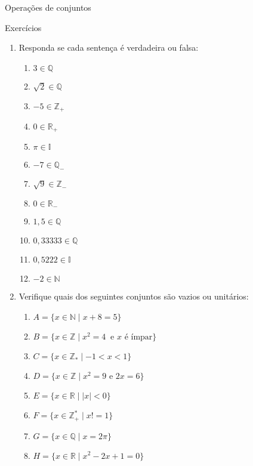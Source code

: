 \documentclass[14pt, aspectratio=169]{beamer}
\newcommand{\R}{\mathbb{R}}
\newcommand{\I}{\mathbb{I}}
\newcommand{\Q}{\mathbb{Q}}
\newcommand{\Z}{\mathbb{Z}}
\newcommand{\N}{\mathbb{N}}
\begin{document}
\begin{frame}[allowframebreaks]{Operações de conjuntos}
\end{frame}

\begin{frame}[allowframebreaks]{Exercícios}

\begin{enumerate}
    \item Responda se cada sentença é verdadeira ou falsa:

    \begin{multicols}{3}
        \begin{enumerate}[a]
                \item $3 \in \Q$
                \item $\sqrt{2} \in \Q$
                \item $-5 \in \Z_+$
                \item $0 \in \R_+$
                \item $\pi \in \I$
                \item $-7 \in \Q_-$
                \item $\sqrt{9} \in \Z_-$
                \item $0 \in \R_-$
                \item $1,5 \in \Q$
                \item $0,33333 \in \Q$
                \item $0,5222 \in \I$
                \item $-2 \in \N$
            \end{enumerate}
    \end{multicols}

    \vspace{5.0cm}

    \item Verifique quais dos seguintes conjuntos são vazios ou unitários:

    \begin{multicols}{2}
        \begin{enumerate}[a]
                \item $A = \{ x \in \N \mid x + 8 = 5 \}$
                \item $B = \{ x \in \Z \mid x^2 = 4 \ \text{ e $x$ é ímpar} \}$
                \item $C = \{ x \in \Z_* \mid -1 < x < 1 \}$
                \item $D = \{ x \in \Z \mid x^2 = 9 \text{ e } 2x = 6 \}$
                \item $E = \{ x \in \R \mid \mid x \mid < 0 \}$
                \item $F = \{ x \in \Z_+^* \mid x! = 1 \}$
                \item $G = \{ x \in \Q \mid x = 2\pi \}$
                \item $H = \{ x \in \R \mid x^2 - 2x + 1 = 0 \}$
            \end{enumerate}
    \end{multicols}


\end{enumerate}
\end{frame}
\end{document}
